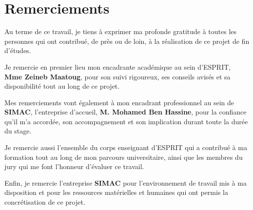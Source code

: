 \chapter*{Remerciements}

Au terme de ce travail, je tiens à exprimer ma profonde gratitude à toutes les personnes qui ont contribué, de près ou de loin, à la réalisation de ce projet de fin d'études.

Je remercie en premier lieu mon encadrante académique au sein d'ESPRIT, \textbf{Mme Zeineb Maatoug}, pour son suivi rigoureux, ses conseils avisés et sa disponibilité tout au long de ce projet.

Mes remerciements vont également à mon encadrant professionnel au sein de \textbf{SIMAC}, l'entreprise d'accueil, \textbf{M. Mohamed Ben Hassine}, pour la confiance qu'il m'a accordée, son accompagnement et son implication durant toute la durée du stage.

Je remercie aussi l'ensemble du corps enseignant d'ESPRIT qui a contribué à ma formation tout au long de mon parcours universitaire, ainsi que les membres du jury qui me font l'honneur d'évaluer ce travail.

Enfin, je remercie l'entreprise \textbf{SIMAC} pour l'environnement de travail mis à ma disposition et pour les ressources matérielles et humaines qui ont permis la concrétisation de ce projet.

\clearpage
